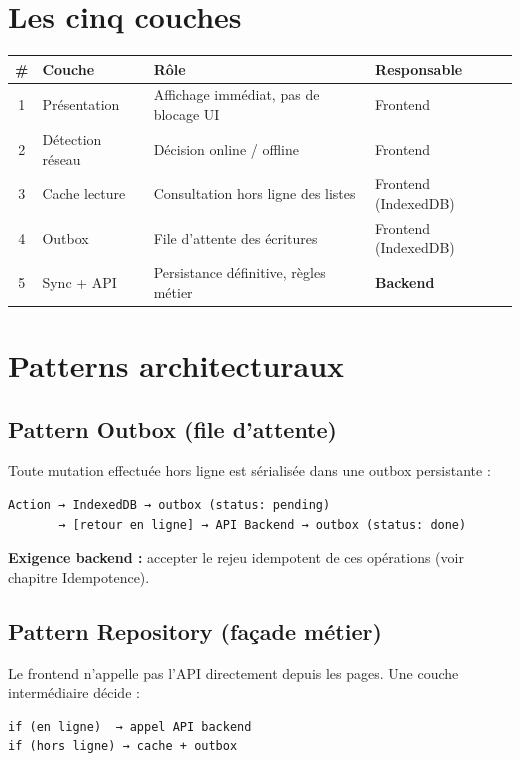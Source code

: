 \documentclass[12pt,a4paper]{report}
\begin{document}
\section{Les cinq couches}

\begin{longtable}{@{}cp{3.2cm}p{4.5cm}p{4.5cm}@{}}
\hline
\textbf{\#} & \textbf{Couche} & \textbf{Rôle} & \textbf{Responsable} \\
\hline
\endhead
1 & Présentation & Affichage immédiat, pas de blocage UI & Frontend \\
\hline
2 & Détection réseau & Décision online / offline & Frontend \\
\hline
3 & Cache lecture & Consultation hors ligne des listes & Frontend (IndexedDB) \\
\hline
4 & Outbox & File d'attente des écritures & Frontend (IndexedDB) \\
\hline
5 & Sync + API & Persistance définitive, règles métier & \textbf{Backend} \\
\hline
\end{longtable}

\section{Patterns architecturaux}

\subsection{Pattern Outbox (file d'attente)}

Toute mutation effectuée hors ligne est sérialisée dans une outbox persistante :

\begin{verbatim}
Action → IndexedDB → outbox (status: pending)
       → [retour en ligne] → API Backend → outbox (status: done)
\end{verbatim}

\textbf{Exigence backend :} accepter le rejeu idempotent de ces opérations (voir chapitre Idempotence).

\subsection{Pattern Repository (façade métier)}

Le frontend n'appelle pas l'API directement depuis les pages. Une couche intermédiaire décide :

\begin{verbatim}
if (en ligne)  → appel API backend
if (hors ligne) → cache + outbox
\end{verbatim}
\end{document}
